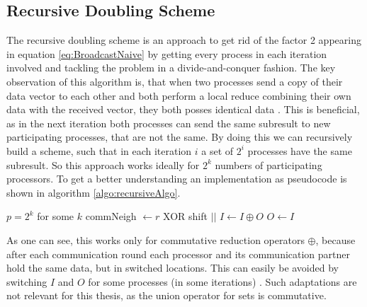 \subsection{Recursive Doubling Scheme} 
The recursive doubling scheme is an approach to get rid of the factor 2 appearing in equation \ref{eq:BroadcastNaive} by getting every process in each iteration involved and tackling the problem in a divide-and-conquer fashion. The key observation of this algorithm is, that when two processes send a copy of their data vector to each other and both perform a local reduce combining their own data with the received vector, they both posses identical data \cite{AllreduceSummaryAll}. This is beneficial, as in the next iteration both processes can send the same subresult to new participating processes, that are not the same.
By doing this we can recursively build a scheme, such that in each iteration $i$ a set of $2^i$ processes have the same subresult. So this approach works ideally for $2^k$ numbers of participating processors. To get a better understanding an implementation as pseudocode is shown in algorithm \ref{algo:recursiveAlgo}.\\
\begin{algorithm}
	\caption{– Recursive Doubling Scheme\\
	\textit{r}: rank Id\\
	\textit{p}: number of processes\\
	: Input array\\
	\textit{O}: Output array} \label{algo:recursiveAlgo}
	\begin{algorithmic}[1]
	\Ensure $p=2^k$ for some $k$
		\State commNeigh $\gets r $ XOR shift 
		\State {} $||$  
		\State $I \gets I\oplus O$ 
		\EndFor
		\State $O \gets I$
	\EndProcedure
	\end{algorithmic}
\end{algorithm}
As one can see, this works only for commutative reduction operators $\oplus$, because after each communication round each processor and its communication partner hold the same data, but in switched locations.  This can easily be avoided by switching $I$ and $O$ for some processes (in some iterations) \cite{NonComAllred}. Such adaptations are not relevant for this thesis, as the union operator for sets is commutative. \\

